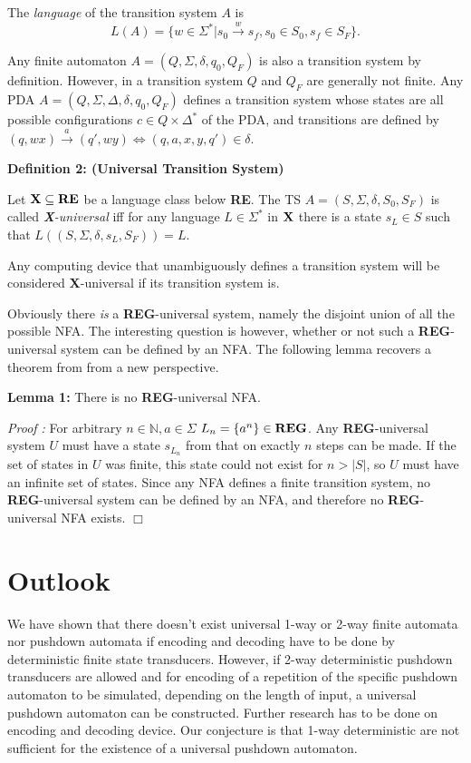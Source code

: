 \documentclass{eptcs}
\def\raa{\longrightarrow}
\newcommand{\Nat}{\mathbb{N}}
\def\raa{\longrightarrow}
\begin{document}
		The \emph{language} of the transition system $A$ is
		$$L(A)= \{w\in\Sigma^*| s_0\stackrel{w}{\raa}s_f, s_0\in S_0, s_f\in S_F\}.$$


	Any finite automaton $A=(Q,\Sigma,\delta,q_0,Q_F)$ is also
	a transition system by definition. However, in a transition system
	$Q$ and $Q_F$ are generally not finite.
	Any PDA $A=(Q,\Sigma,\Delta,\delta,q_0,Q_F)$ defines a transition system
	whose states are all possible configurations $c\in Q\times\Delta^*$ of 
	the PDA, and transitions are defined by
	$(q,wx)\stackrel{a}{\raa}(q',wy) \iff (q,a,x,y,q')\in \delta$.

\bigskip

\noindent
{\bf Definition 2: (Universal Transition System)}

		  Let ${\bf X}\subseteq {\bf RE}$ be a language class below {\bf RE}.
		  The TS $A=(S,\Sigma,\delta,S_0,S_F)$ is called 
		  \emph{{\bf X}-universal} iff for any language 
		  $L\in \Sigma^*$ in ${\bf X}$ there is a state $s_L\in S$ such that 
$L((S,\Sigma,\delta,s_L,S_F))=L$.


Any computing device that unambiguously defines a transition system will be 
considered {\bf X}-universal if its transition system is. 

Obviously there \emph{is} a {\bf REG}-universal
system, namely the disjoint union of all the possible NFA.
The interesting question is however, whether or not such a 
{\bf REG}-universal system can be defined by an NFA.
The following lemma recovers a theorem from \cite{Kud}
from a new perspective.

\bigskip

\noindent
{\bf Lemma 1:}
		  There is no {\bf REG}-universal NFA.

\noindent
{\it Proof :}
	For arbitrary $n\in \Nat,a\in \Sigma$ $L_n=\{a^n\} \in {\bf REG}$.
	Any {\bf REG}-universal system $U$ must have a state $s_{L_n}$ 
	from that on exactly $n$ steps can be made.
	If the set of states in $U$ was finite, this state
	could not exist for $n>|S|$, so $U$ must have an infinite set of states.
	Since any NFA defines a finite transition system, no {\bf REG}-universal 
	system can be defined by an NFA, and therefore no {\bf REG}-universal
	NFA exists.
\hfill$\Box$	

\section{Outlook}

We have shown that there doesn't exist
universal 1-way or 2-way finite automata nor pushdown
automata if encoding and decoding have to be done by
deterministic finite state transducers. However, if
2-way deterministic pushdown transducers are allowed and
for encoding
of a repetition of the specific pushdown automaton to
be simulated, depending on the length of input,
a universal pushdown automaton can be constructed.
Further research has to be done on encoding and decoding
device. Our conjecture is that 1-way deterministic are
not sufficient for the existence of a universal
pushdown automaton.
\end{document}
